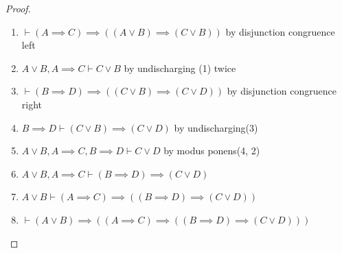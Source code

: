 \begin{proof}
\begin{enumerate}
\item $\vdash(A\implies C)\implies((A\lor B)\implies(C\lor B))$ by
  disjunction congruence left%
\item $A\lor B,A\implies C\vdash C\lor B$ by undischarging (1) twice%
\item $\vdash(B\implies D)\implies((C\lor B)\implies(C\lor D))$ by
  disjunction congruence right%
\item $B\implies D\vdash(C\lor B)\implies(C\lor D)$ by undischarging(3)%
\item $A\lor B,A\implies C,B\implies D\vdash C\lor D$ by modus
  ponens(4, 2)
\item $A\lor B,A\implies C\vdash(B\implies D)\implies(C\lor D)$
\item $A\lor B\vdash(A\implies C)\implies((B\implies D)\implies(C\lor D))$
\item $\vdash(A\lor B)\implies((A\implies C)\implies((B\implies D)\implies(C\lor D)))$\qedhere
\end{enumerate}
\end{proof}

